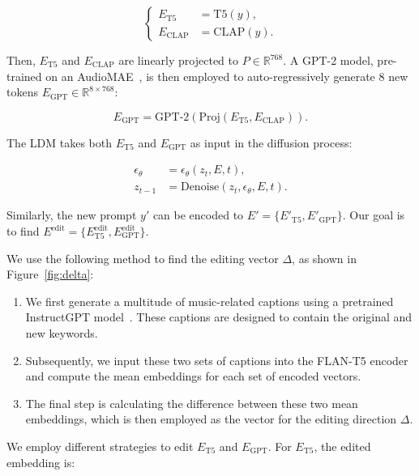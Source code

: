 \begin{equation}
\left\{
\begin{aligned}
E_\text{T5} &= \text{T5}(y), \\
E_\text{CLAP} &= \text{CLAP}(y).
\end{aligned}
\right.
\end{equation}

Then, $E_\text{T5}$ and $E_\text{CLAP}$ are  linearly projected to \( P \in \mathbb{R}^{768} \). A GPT-2 model, pre-trained on an AudioMAE~\cite{audioMAE}, is then employed to auto-regressively generate 8 new tokens \( E_\text{GPT} \in \mathbb{R}^{8 \times 768} \):

\begin{equation}
E_\text{GPT} = \text{GPT-2}(\text{Proj}(E_\text{T5}, E_\text{CLAP})).
\end{equation}

The LDM takes both $E_\text{T5}$ and $E_\text{GPT}$ as input in the diffusion process:

\begin{align}
\epsilon_\theta &= \epsilon_\theta(z_t, E, t), \\
z_{t-1} &= \text{Denoise}(z_t, \epsilon_\theta, E, t).
\end{align}

Similarly, the new prompt $y'$ can be encoded to $E' = \{E'_\text{T5}, E'_\text{GPT}\}$. Our goal is to find $E^\text{edit} = \{E^\text{edit}_\text{T5}, E^\text{edit}_\text{GPT}\}$.

We use the following method to find the editing vector $\Delta$, as shown in Figure~\ref{fig:delta}:

\begin{enumerate}[itemsep=0pt, parsep=0pt]
    \item We first generate a multitude of music-related captions using a pretrained InstructGPT model~\cite{instructGPT}. These captions are designed to contain the original and new keywords.
    \item Subsequently, we input these two sets of captions into the FLAN-T5 encoder and compute the mean embeddings for each set of encoded vectors.
    \item The final step is calculating the difference between these two mean embeddings, which is then employed as the vector for the editing direction $\Delta$.
\end{enumerate}

We employ different strategies to edit $E_\text{T5}$ and $E_\text{GPT}$. For $E_\text{T5}$, the edited embedding is:


